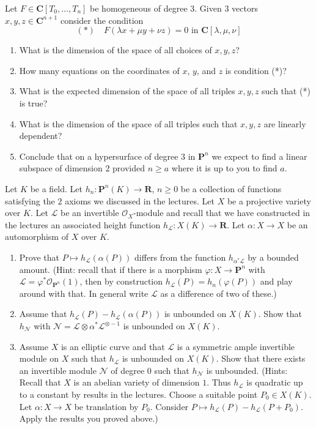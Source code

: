\begin{exercise}
\label{exercise-cubics}
Let $F \in \mathbf{C}[T_0, \ldots, T_n]$ be homogeneous of degree $3$.
Given $3$ vectors $x, y, z \in \mathbf{C}^{n + 1}$ consider the condition
$$
(*)\quad
F(\lambda x + \mu y + \nu z) = 0 \text{ in } \mathbf{C}[\lambda, \mu, \nu]
$$
\begin{enumerate}
\item What is the dimension of the space of all choices of $x, y, z$?
\item How many equations on the coordinates of $x$, $y$, and $z$
is condition (*)?
\item What is the expected dimension of the space of all triples
$x, y, z$ such that (*) is true?
\item What is the dimension of the space of all triples such that
$x, y, z$ are linearly dependent?
\item Conclude that on a hypersurface of degree $3$ in $\mathbf{P}^n$
we expect to find a linear subspace of dimension $2$ provided
$n \geq a$ where it is up to you to find $a$.
\end{enumerate}
\end{exercise}

\begin{exercise}[Heights]
\label{exercise-heights}
Let $K$ be a field. Let $h_n : \mathbf{P}^n(K) \to \mathbf{R}$, $n \geq 0$
be a collection of functions satisfying the $2$ axioms we discussed
in the lectures. Let $X$ be a projective variety
over $K$. Let $\mathcal{L}$ be an invertible $\mathcal{O}_X$-module
and recall that we have constructed in the lectures an associated
height function $h_\mathcal{L} : X(K) \to \mathbf{R}$.
Let $\alpha : X \to X$ be an automorphism of $X$ over $K$.
\begin{enumerate}
\item Prove that $P \mapsto h_\mathcal{L}(\alpha(P))$
differs from the function $h_{\alpha^*\mathcal{L}}$
by a bounded amount. (Hint: recall that if there is a morphism
$\varphi : X \to \mathbf{P}^n$ with
$\mathcal{L} = \varphi^*\mathcal{O}_{\mathbf{P}^n}(1)$, then by construction
$h_\mathcal{L}(P) = h_n(\varphi(P))$ and play around with that.
In general write $\mathcal{L}$ as a difference of two of these.)
\item Assume that $h_\mathcal{L}(P) - h_\mathcal{L}(\alpha(P))$
is unbounded on $X(K)$. Show that
$h_\mathcal{N}$ with
$\mathcal{N} = \mathcal{L} \otimes \alpha^*\mathcal{L}^{\otimes -1}$
is unbounded on $X(K)$.
\item Assume $X$ is an elliptic curve and that
$\mathcal{L}$ is a symmetric ample invertible module on $X$
such that $h_\mathcal{L}$ is unbounded on $X(K)$. Show
that there exists an invertible module $\mathcal{N}$ of degree $0$
such that $h_\mathcal{N}$ is unbounded.
(Hints: Recall that $X$ is an abelian variety of dimension $1$.
Thus $h_\mathcal{L}$ is quadratic up to a constant by results
in the lectures. Choose a suitable point $P_0 \in X(K)$.
Let $\alpha : X \to X$ be translation by $P_0$. Consider
$P \mapsto h_\mathcal{L}(P) - h_\mathcal{L}(P + P_0)$.
Apply the results you proved above.)
\end{enumerate}
\end{exercise}


